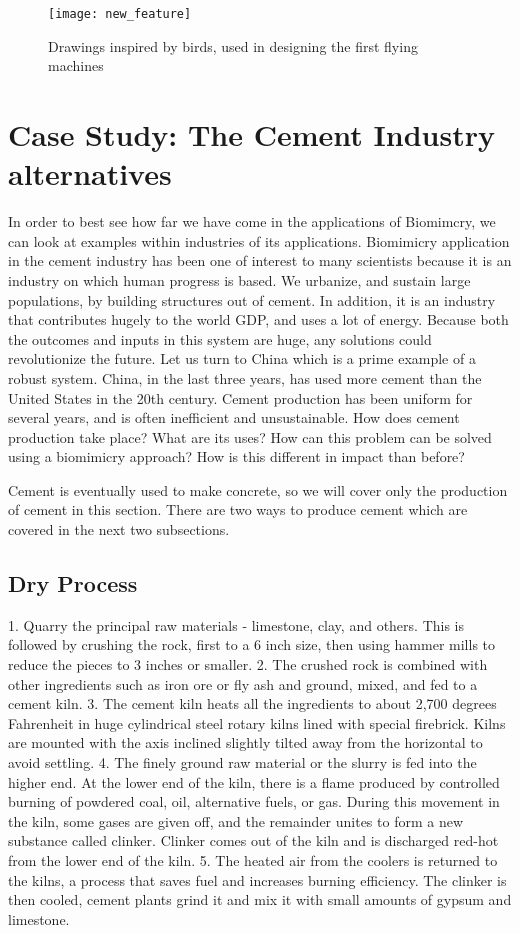
\begin{figure}
\texttt{[image: new\_feature]}
\caption{Drawings inspired by birds, used in designing the first flying machines}
\label{fig:news_featured}
\end{figure}

\section{Case Study: The Cement Industry alternatives}

In order to best see how far we have come in the applications of Biomimcry, we can look at examples within industries of its applications. Biomimicry application in the cement industry has been one of interest to many scientists because it is an industry on which human progress is based. We urbanize, and sustain large populations, by building structures out of cement. In addition, it is an industry that contributes hugely to the world GDP, and uses a lot of energy. Because both the outcomes and inputs in this system are huge, any solutions could revolutionize the future. Let us turn to China which is a prime example of a robust system.
China, in the last three years, has used more cement than the United States in the 20th century.  Cement production has been uniform for several years, and is often inefficient and unsustainable. How does cement production take place? What are its uses? How can this problem can be solved using a biomimicry approach? How is this different in impact than before?

Cement is eventually used to make concrete, so we will cover only the production of cement in this section. There are two ways to produce cement which are covered in the next two subsections.

\subsection{Dry Process}

1.	Quarry the principal raw materials - limestone, clay, and others. This is followed by crushing the rock, first to a 6 inch size, then using hammer mills to reduce the pieces to 3 inches or smaller.
2.	The crushed rock is combined with other ingredients such as iron ore or fly ash and ground, mixed, and fed to a cement kiln.
3.	The cement kiln heats all the ingredients to about 2,700 degrees Fahrenheit in huge cylindrical steel rotary kilns lined with special firebrick. Kilns are mounted with the axis inclined slightly tilted away from the horizontal to avoid settling.
4.	The finely ground raw material or the slurry is fed into the higher end. At the lower end of the kiln, there is a flame produced by controlled burning of powdered coal, oil, alternative fuels, or gas. During this movement in the kiln, some gases are given off, and the remainder unites to form a new substance called clinker. Clinker comes out of the kiln and is discharged red-hot from the lower end of the kiln.
5.	The heated air from the coolers is returned to the kilns, a process that saves fuel and increases burning efficiency. The clinker is then cooled, cement plants grind it and mix it with small amounts of gypsum and limestone. 

